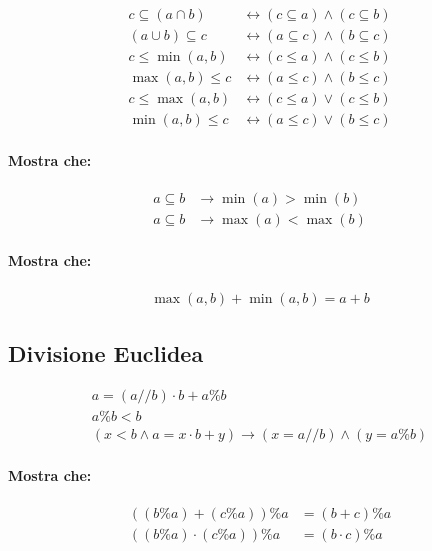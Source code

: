 \documentclass{article}
\begin{document}
\begin{align*}
c \subseteq (a \cap b) &\longleftrightarrow (c \subseteq a) \land (c \subseteq b)\\
(a \cup b) \subseteq c &\longleftrightarrow (a \subseteq c) \land (b \subseteq c)\\
c \le \min(a, b) &\longleftrightarrow (c \le a) \land (c \le b)\\
\max(a, b) \le c &\longleftrightarrow (a \le c) \land (b \le c)\\
c \le \max(a, b) &\longleftrightarrow (c \le a) \lor (c \le b)\\
\min(a, b) \le c&\longleftrightarrow (a \le c) \lor (b \le c)
\end{align*}

\paragraph{Mostra che:}

\begin{align*}
a \subseteq b &\longrightarrow \min(a) > \min(b)\\
a \subseteq b &\longrightarrow \max(a) < \max(b)
\end{align*}

\paragraph{Mostra che:}

\begin{align*}
\max(a, b) + \min(a, b) = a + b
\end{align*}

\subsection*{Divisione Euclidea}

\begin{align*}
a = (a // b) \cdot b + a \% b\\
a \% b < b\\
(x < b \land a = x \cdot b + y) \rightarrow (x = a // b) \land (y = a \% b) 
\end{align*}

\paragraph{Mostra che:}

\begin{align*}
((b \% a) + (c \% a)) \% a &= (b + c) \% a\\
((b \% a) \cdot (c \% a)) \% a &= (b \cdot c) \% a
\end{align*}
\end{document}
